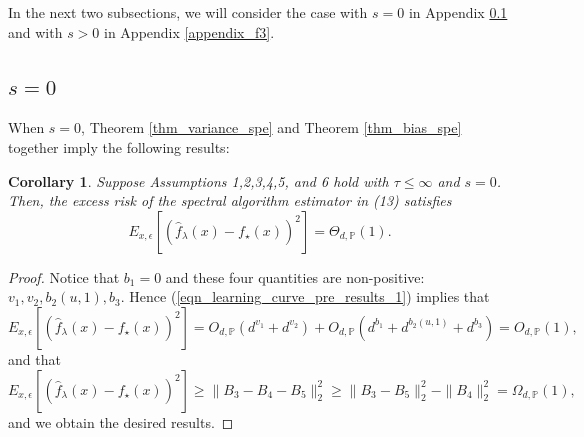 \documentclass{article}
\theoremstyle{plain}
\newtheorem{corollary}[theorem]{Corollary}
\theoremstyle{definition}
\theoremstyle{remark}
\begin{document}
\begin{appendix}
\begin{itemize}
\end{itemize}



















In the next two subsections, we will consider the case with $s=0$ in Appendix \ref{appendix_f2} and with $s>0$ in Appendix \ref{appendix_f3}. 





\subsection{$s=0$}\label{appendix_f2}

When $s=0$, Theorem \ref{thm_variance_spe} and Theorem \ref{thm_bias_spe} together imply the following results:

\begin{corollary}\label{coroll_learn_curve_case_1}
    Suppose Assumptions 1,2,3,4,5, and 6 hold with $\tau \leq \infty$ and $s=0$. Then, the excess risk of the spectral algorithm estimator in (13) satisfies
\begin{equation*}
    E_{x, \epsilon} \left[ \left(\hat{f}_{\lambda}(x) - f_{\star}(x) \right)^{2} \right] = \Theta_{d, \mathbb{P}} \left( 1 \right).
\end{equation*}
\end{corollary}
\begin{proof}
    Notice that $b_1=0$ and these four quantities are non-positive:  $v_1, v_2,  b_2(u, 1), b_3$. Hence (\ref{eqn_learning_curve_pre_results_1}) implies that 
    $$
    E_{x, \epsilon} \left[ \left(\hat{f}_{\lambda}(x) - f_{\star}(x) \right)^{2} \right] = O_{d, \mathbb{P}} \left( d^{v_1} + d^{v_2} \right) + O_{d, \mathbb{P}} \left( d^{b_1} + d^{b_2(u, 1)} + d^{b_3} \right) = O_{d, \mathbb{P}} \left( 1 \right),
    $$
    and that
    $$
    E_{x, \epsilon} \left[ \left(\hat{f}_{\lambda}(x) - f_{\star}(x) \right)^{2} \right] \geq 
    \|B_3-B_4-B_5\|_{2}^{2} \geq \|B_3-B_5\|_{2}^{2} - \|B_4\|_{2}^{2}
    = \Omega_{d, \mathbb{P}} \left( 1 \right),
    $$
    and we obtain the desired results.
\end{proof}





\end{appendix}
\end{document}
